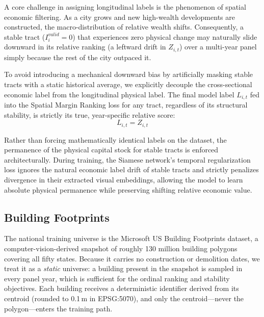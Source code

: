 \documentclass[conference]{IEEEtran}
\begin{document}
A core challenge in assigning longitudinal labels is the phenomenon of spatial economic filtering. As a city grows and new high-wealth developments are constructed, the macro-distribution of relative wealth shifts. Consequently, a stable tract ($I_{i}^{valid} = 0$) that experiences zero physical change may naturally slide downward in its relative ranking (a leftward drift in $Z_{i,t}$) over a multi-year panel simply because the rest of the city outpaced it.

To avoid introducing a mechanical downward bias by artificially masking stable tracts with a static historical average, we explicitly decouple the cross-sectional economic label from the longitudinal physical label. The final model label $L_{i,t}$ fed into the Spatial Margin Ranking loss for any tract, regardless of its structural stability, is strictly its true, year-specific relative score:
\begin{equation}
L_{i,t} = Z_{i,t}
\end{equation}

Rather than forcing mathematically identical labels on the dataset, the permanence of the physical capital stock for stable tracts is enforced architecturally. During training, the Siamese network's temporal regularization loss ignores the natural economic label drift of stable tracts and strictly penalizes divergence in their extracted visual embeddings, allowing the model to learn absolute physical permanence while preserving shifting relative economic value.

\subsection{Building Footprints}
\label{sec:buildings}

The national training universe is the Microsoft US Building Footprints dataset, a computer-vision-derived snapshot of roughly 130 million building polygons covering all fifty states. Because it carries no construction or demolition dates, we treat it as a \emph{static} universe: a building present in the snapshot is sampled in every panel year, which is sufficient for the ordinal ranking and stability objectives. Each building receives a deterministic identifier derived from its centroid (rounded to 0.1\,m in EPSG:5070), and only the centroid—never the polygon—enters the training path.
\end{document}
